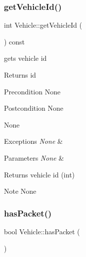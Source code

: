 \hypertarget{class_vehicle_a39f3a50c413161b345f0230529994ccb}{}\label{class_vehicle_a39f3a50c413161b345f0230529994ccb} 
\subsubsection{\texorpdfstring{get\+Vehicle\+Id()}{getVehicleId()}}
{\footnotesize\ttfamily int Vehicle\+::get\+Vehicle\+Id (\begin{DoxyParamCaption}{ }\end{DoxyParamCaption}) const}



gets vehicle id 

Returns id

\begin{DoxyPrecond}{Precondition}
None
\end{DoxyPrecond}
\begin{DoxyPostcond}{Postcondition}
None
\end{DoxyPostcond}
\begin{DoxyParagraph}{None}

\end{DoxyParagraph}

\begin{DoxyExceptions}{Exceptions}
{\em None} & \\
\hline
\end{DoxyExceptions}

\begin{DoxyParams}{Parameters}
{\em None} & \\
\hline
\end{DoxyParams}
\begin{DoxyReturn}{Returns}
vehicle id (int)
\end{DoxyReturn}
\begin{DoxyNote}{Note}
None 
\end{DoxyNote}
\hypertarget{class_vehicle_acfbaaeb20003015ae6af55426f5e6f46}{}\label{class_vehicle_acfbaaeb20003015ae6af55426f5e6f46} 
\subsubsection{\texorpdfstring{has\+Packet()}{hasPacket()}}
{\footnotesize\ttfamily bool Vehicle\+::has\+Packet (\begin{DoxyParamCaption}{ }\end{DoxyParamCaption})\hspace{0.3cm}{\ttfamily [inline]}}

